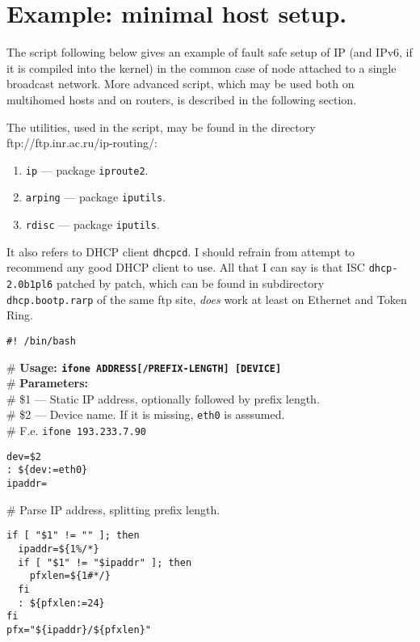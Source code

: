 \section{Example: minimal host setup.}
\label{EXAMPLE-SETUP}

The script following below gives an example of fault safe
setup of IP (and IPv6, if it is compiled into the kernel)
in the common case of node attached to a single broadcast
network. More advanced script, which may be used both on multihomed
hosts and on routers, is described in the following
section.

The utilities, used in the script, may be found in the
directory ftp://ftp.inr.ac.ru/ip-routing/:
\begin{enumerate}
\item \verb|ip| --- package \verb|iproute2|.
\item \verb|arping| --- package \verb|iputils|.
\item \verb|rdisc| --- package \verb|iputils|.
\end{enumerate}
\begin{NB}
It also refers to DHCP client \verb|dhcpcd|. I should refrain from
attempt to recommend any good DHCP client to use. All that I can
say is that ISC \verb|dhcp-2.0b1pl6| patched by patch, which
can be found in subdirectory \verb|dhcp.bootp.rarp| of
the same ftp site, {\em does\/} work
at least on Ethernet and Token Ring.
\end{NB}

\begin{verbatim}
#! /bin/bash
\end{verbatim}
\begin{flushleft}
\# {\bf Usage: \verb|ifone ADDRESS[/PREFIX-LENGTH] [DEVICE]|}\\
\# {\bf Parameters:}\\
\# \$1 --- Static IP address, optionally followed by prefix length.\\
\# \$2 --- Device name. If it is missing, \verb|eth0| is asssumed.\\
\# F.e. \verb|ifone 193.233.7.90|
\end{flushleft}
\begin{verbatim}
dev=$2
: ${dev:=eth0}
ipaddr=
\end{verbatim}
\# Parse IP address, splitting prefix length.
\begin{verbatim}
if [ "$1" != "" ]; then
  ipaddr=${1%/*}
  if [ "$1" != "$ipaddr" ]; then
    pfxlen=${1#*/}
  fi
  : ${pfxlen:=24}
fi
pfx="${ipaddr}/${pfxlen}"
\end{verbatim}

